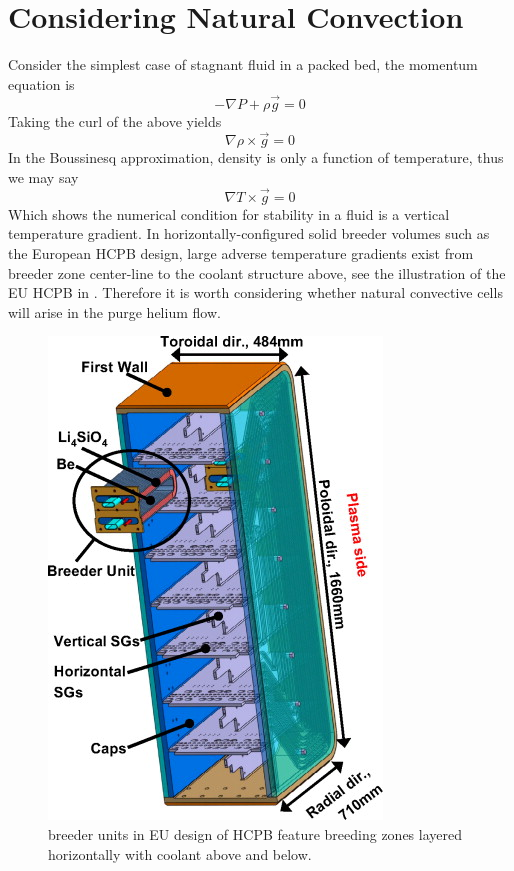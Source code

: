 \chapter{Considering Natural Convection}\label{sec:natural-convection}

Consider the simplest case of stagnant fluid in a packed bed, the momentum equation is
\begin{equation}
-\nabla P + \rho \vec{g} = 0
\end{equation}
Taking the curl of the above yields
\begin{equation}
\nabla \rho \times \vec{g} = 0
\end{equation}
In the Boussinesq approximation, density is only a function of temperature, thus
we may say
\begin{equation}
\nabla T \times \vec{g} = 0
\end{equation}
Which shows the numerical condition for stability in a fluid is a vertical temperature gradient. In horizontally-configured solid breeder volumes such as the European HCPB design, large adverse temperature gradients exist from breeder zone center-line to the coolant structure above, see the illustration of the EU HCPB in . Therefore it is worth considering whether natural convective cells will arise in the purge helium flow.

\begin{figure}[ht]
	\centering
	\includegraphics[width=\singleimagewidth]{figures/eu-hcpb-2.png} 
	\caption{breeder units in EU design of HCPB feature breeding zones layered horizontally with coolant above and below.}
	\label{fig:eu-hcpb-2}
\end{figure}


